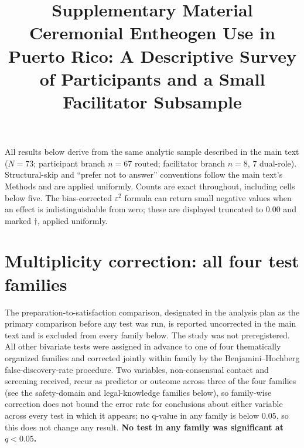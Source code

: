 \documentclass[12pt]{article}
\title{Supplementary Material\\
\large Ceremonial Entheogen Use in Puerto Rico: A Descriptive Survey of Participants and a Small
Facilitator Subsample}
\date{}
\begin{document}
\maketitle

\noindent
All results below derive from the same analytic sample
described in the main text ($N=73$; participant branch $n=67$ routed; facilitator branch $n=8$, 7
dual-role). Structural-skip and ``prefer not to answer'' conventions follow the main text's Methods
and are applied uniformly. Counts are exact throughout, including cells below five. The bias-corrected
$\varepsilon^2$ formula can return small negative values when an effect is indistinguishable from
zero; these are displayed truncated to 0.00 and marked $\dagger$, applied uniformly.

\section{Multiplicity correction: all four test families}

The preparation-to-satisfaction comparison, designated in the analysis plan as the primary comparison
before any test was run, is reported uncorrected in the main text and is excluded from every family below.
The study was not preregistered. All other bivariate tests were assigned in advance to one of four
thematically organized families and corrected jointly within family by the Benjamini--Hochberg
false-discovery-rate procedure. Two variables, non-consensual contact and screening received, recur as
predictor or outcome across three of the four families (see the safety-domain and legal-knowledge families
below), so family-wise correction does not bound the error rate for conclusions about either variable across
every test in which it appears; no q-value in any family is below 0.05, so this does not change any result.
\textbf{No test in any family was significant at $q<0.05$.}
\end{document}
